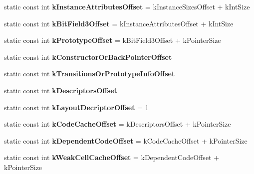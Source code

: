 \begin{DoxyCompactItemize}
\item 
static const int {\bfseries k\+Instance\+Attributes\+Offset} = k\+Instance\+Sizes\+Offset + k\+Int\+Size\hypertarget{classv8_1_1internal_1_1_map_a30dbbec5152d64e484d586a918b5be0a}{}\label{classv8_1_1internal_1_1_map_a30dbbec5152d64e484d586a918b5be0a}

\item 
static const int {\bfseries k\+Bit\+Field3\+Offset} = k\+Instance\+Attributes\+Offset + k\+Int\+Size\hypertarget{classv8_1_1internal_1_1_map_a58d829391df48dd6ed224f188b3420de}{}\label{classv8_1_1internal_1_1_map_a58d829391df48dd6ed224f188b3420de}

\item 
static const int {\bfseries k\+Prototype\+Offset} = k\+Bit\+Field3\+Offset + k\+Pointer\+Size\hypertarget{classv8_1_1internal_1_1_map_ae771e9e987681d98dd684c85b18c9a61}{}\label{classv8_1_1internal_1_1_map_ae771e9e987681d98dd684c85b18c9a61}

\item 
static const int {\bfseries k\+Constructor\+Or\+Back\+Pointer\+Offset}
\item 
static const int {\bfseries k\+Transitions\+Or\+Prototype\+Info\+Offset}
\item 
static const int {\bfseries k\+Descriptors\+Offset}
\item 
static const int {\bfseries k\+Layout\+Decriptor\+Offset} = 1\hypertarget{classv8_1_1internal_1_1_map_a4f61b78bd8e03d6b6e5c58a9b4bf91f7}{}\label{classv8_1_1internal_1_1_map_a4f61b78bd8e03d6b6e5c58a9b4bf91f7}

\item 
static const int {\bfseries k\+Code\+Cache\+Offset} = k\+Descriptors\+Offset + k\+Pointer\+Size\hypertarget{classv8_1_1internal_1_1_map_ac3ced53934ca552850c1ac86de495eb6}{}\label{classv8_1_1internal_1_1_map_ac3ced53934ca552850c1ac86de495eb6}

\item 
static const int {\bfseries k\+Dependent\+Code\+Offset} = k\+Code\+Cache\+Offset + k\+Pointer\+Size\hypertarget{classv8_1_1internal_1_1_map_a958ba93be0a3eb39e2465320493b2180}{}\label{classv8_1_1internal_1_1_map_a958ba93be0a3eb39e2465320493b2180}

\item 
static const int {\bfseries k\+Weak\+Cell\+Cache\+Offset} = k\+Dependent\+Code\+Offset + k\+Pointer\+Size\hypertarget{classv8_1_1internal_1_1_map_a9cb8760a15ffcd5712df1cd88344f9b2}{}\label{classv8_1_1internal_1_1_map_a9cb8760a15ffcd5712df1cd88344f9b2}


\end{DoxyCompactItemize}
